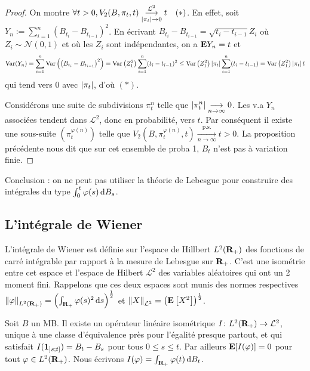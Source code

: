 	\begin{proof}
		On montre $\forall t > 0, V_2(B,\pi_t,t) \underset{\left\lvert\pi_t\right\rvert \to 0}{\overset{\mathcal{L}^2}{\longrightarrow}} t\quad  (*)$.
		En effet, soit $Y_n := \sum_{i = 1}^n \left( B_{t_i} - B_{t_{i-1}} \right)^2$.
		En écrivant $B_{t_i} - B_{t_{i-1}} = \sqrt{t_i - t_{i-1}} Z_i$ où $Z_i \sim \mathcal{N}(0,1)$ et où les $Z_i$ sont indépendantes, on a $\mathbf{E} Y_n = t$ et
		$$\operatorname{Var}(Y_n) = \sum_{i = 1}^n \operatorname{Var} \left( \left( B_{t_i} - B_{t_{i-1}} \right)^2 \right)
			= \operatorname{Var} \left( Z_1^2 \right) \sum_{i = 1}^n (t_i - t_{i - 1})^2
			\leq \operatorname{Var} \left( Z_1^2 \right) \left\lvert\pi_t\right\rvert \sum_{i = 1}^n (t_i - t_{i - 1})
			= \operatorname{Var} \left( Z_1^2 \right) \left\lvert\pi_t\right\rvert t$$
		qui tend vers $0$ avec $\left\lvert\pi_t\right\rvert$, d'où $(*)$.
		
		Considérons une suite de subdivisions $\pi_t^n$ telle que $\left\lvert\pi_t^n\right\rvert \underset{n \to \infty}{\longrightarrow} 0$.
		Les v.a $Y_n$ associées tendent dans $\mathcal{L}^2$, donc en probabilité, vers $t$.
		Par conséquent il existe une sous-suite $\left( \pi_t^{\varphi(n)} \right)$ telle que $V_2(B,\pi_t^{\varphi(n)},t) \underset{n \to \infty}{\overset{\text{p.s.}}{\longrightarrow}} t > 0$.
		La proposition précédente nous dit que sur cet ensemble de proba 1, $B_t$ n'est pas à variation finie.
	\end{proof}

	Conclusion : on ne peut pas utiliser la théorie de Lebesgue pour construire des intégrales du type $\int_0^t \varphi(s) \mathop{}\mathopen{}\mathrm{d} B_s$.


\subsection{L'intégrale de Wiener}

	L'intégrale de Wiener est définie sur l'espace de Hillbert $L^2(\mathbf{R}_+)$ des fonctions de carré intégrable par rapport à la mesure de Lebesgue sur $\mathbf{R}_+$.
	C'est une isométrie entre cet espace et l'espace de Hilbert $\mathcal{L}^2$ des variables aléatoires qui ont un 2 moment fini.
	Rappelons que ces deux espaces sont munis des normes respectives $\left\lVert\varphi\right\rVert_{L^2(\mathbf{R}_+)} = \left( \int_{\mathbf{R}_+} \varphi(s)^2 \mathop{}\mathopen{}\mathrm{d} s \right)^{\frac{1}{2}}$ et $\left\lVert X\right\rVert_{\mathcal{L}^2} = \left( \mathbf{E} \left[ X^2 \right] \right)^{\frac{1}{2}}$.
	
	\begin{thm}
		Soit $B$ un MB.
		Il existe un opérateur linéaire isométrique $I \colon L^2(\mathbf{R}_+) \to \mathcal{L}^2$, unique à une classe d'équivalence près pour l'égalité presque partout, et qui satisfait $I(\operatorname{\mathbf{1}}_{\mathopen{}\mathclose{\left]s\mathclose{}\mathpunct{};t\right]}}) = B_t - B_s$ pour tous $0 \leq s \leq t$.
		Par ailleurs $\mathbf{E}[I(\varphi)] = 0$ pour tout $\varphi \in L^2(\mathbf{R}_+)$.
		Nous écrivons $I(\varphi) = \int_{\mathbf{R}_+} \varphi(t) \mathop{}\mathopen{}\mathrm{d} B_t$.
	\end{thm}
	
